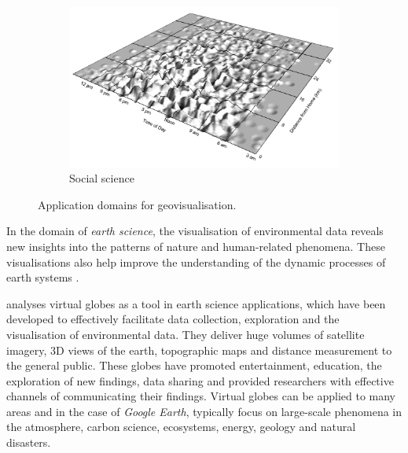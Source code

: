 \documentclass[
	fontsize=11pt
	headlines=2,
	footlines=2,
	parskip=half
]{scrartcl}
\newcommand{\subfigcaptionskip}{\vspace{-10pt}}
\newcommand{\bibentry}[1]{
	\addtocategory{exclude}{#1}
	\fullcite{#1}
}
\begin{document}
{{\begin{figure}[H]
\begin{subfigure}[b]{\applicationwidth}
	                \label{fig:public_health}
		        \end{subfigure}
		        \begin{subfigure}[b]{\applicationwidth}
	                \includegraphics[width=\textwidth,height=\applicationheight]{images/social-science}
	                	\caption{Social science \parencite{kwan2004geovisualization}}
	                \label{fig:social_science}
		        \end{subfigure}
				\caption{Application domains for geovisualisation.}
				\subfigcaptionskip
				\label{fig:geovisualisation_applications}
			\end{figure}


			In the domain of \emph{earth science}, the visualisation of environmental data reveals new insights into the patterns of nature and human-related phenomena. These visualisations also help improve the understanding of the dynamic processes of earth systems \parencite{yu2012google}.

			\textcite{yu2012google} analyses virtual globes as a tool in earth science applications, which have been developed to effectively facilitate data collection, exploration and the visualisation of environmental data. They deliver huge volumes of satellite imagery, 3D views of the earth, topographic maps and distance measurement to the general public. These globes have promoted entertainment, education, the exploration of new findings, data sharing and provided researchers with effective channels of communicating their findings. Virtual globes can be applied to many areas and in the case of \emph{Google Earth}, typically focus on large-scale phenomena in the atmosphere, carbon science, ecosystems, energy, geology and natural disasters.

}}
\end{document}
